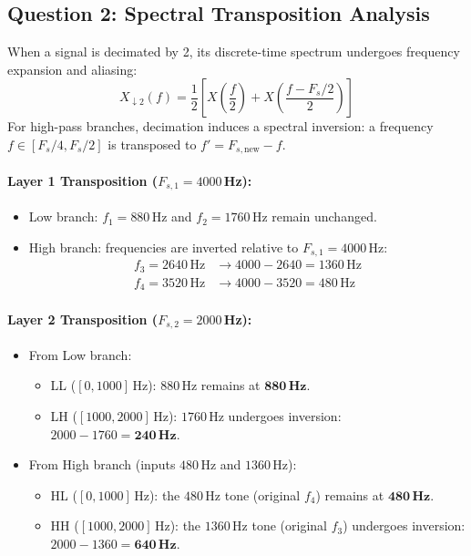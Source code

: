 \documentclass{rapportCS}
\begin{document}
\subsection{Question 2: Spectral Transposition Analysis}

When a signal is decimated by 2, its discrete-time spectrum undergoes frequency expansion and aliasing:
\begin{equation}
    X_{\downarrow 2}(f) = \frac{1}{2} \left[ X\left(\frac{f}{2}\right) + X\left(\frac{f - F_s/2}{2}\right) \right]
\end{equation}
For high-pass branches, decimation induces a spectral inversion: a frequency $f \in [F_s/4, F_s/2]$ is transposed to $f' = F_{s, \text{new}} - f$.

\paragraph{Layer 1 Transposition ($F_{s,1} = 4000$\,Hz):}
\begin{itemize}
    \item Low branch: $f_1 = 880$\,Hz and $f_2 = 1760$\,Hz remain unchanged.
    \item High branch: frequencies are inverted relative to $F_{s,1} = 4000$\,Hz:
    \begin{align}
        f_3 = 2640\,\text{Hz} &\longrightarrow 4000 - 2640 = 1360\,\text{Hz} \\
        f_4 = 3520\,\text{Hz} &\longrightarrow 4000 - 3520 = 480\,\text{Hz}
    \end{align}
\end{itemize}

\paragraph{Layer 2 Transposition ($F_{s,2} = 2000$\,Hz):}
\begin{itemize}
    \item From Low branch:
    \begin{itemize}
        \item LL ($[0, 1000]$\,Hz): $880$\,Hz remains at $\mathbf{880\,\text{Hz}}$.
        \item LH ($[1000, 2000]$\,Hz): $1760$\,Hz undergoes inversion: $2000 - 1760 = \mathbf{240\,\text{Hz}}$.
    \end{itemize}
    \item From High branch (inputs $480$\,Hz and $1360$\,Hz):
    \begin{itemize}
        \item HL ($[0, 1000]$\,Hz): the $480$\,Hz tone (original $f_4$) remains at $\mathbf{480\,\text{Hz}}$.
        \item HH ($[1000, 2000]$\,Hz): the $1360$\,Hz tone (original $f_3$) undergoes inversion: $2000 - 1360 = \mathbf{640\,\text{Hz}}$.
    \end{itemize}
\end{itemize}
\end{document}
